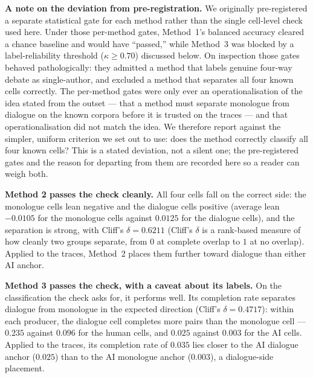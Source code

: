 \documentclass[10pt,twocolumn]{article}
\begin{document}
\textbf{A note on the deviation from pre-registration.} We originally pre-registered a separate
statistical gate for each method rather than the single cell-level check used here. Under those
per-method gates, Method~1's balanced accuracy cleared a chance baseline and would have ``passed,''
while Method~3 was blocked by a label-reliability threshold ($\kappa \ge 0.70$) discussed below. On
inspection those gates behaved pathologically: they admitted a method that labels genuine four-way
debate as single-author, and excluded a method that separates all four known cells correctly. The
per-method gates were only ever an operationalisation of the idea stated from the outset --- that a
method must separate monologue from dialogue on the known corpora before it is trusted on the traces
--- and that operationalisation did not match the idea. We therefore report against the simpler,
uniform criterion we set out to use: does the method correctly classify all four known cells? This is
a stated deviation, not a silent one; the pre-registered gates and the reason for departing from them
are recorded here so a reader can weigh both.

\textbf{Method 2 passes the check cleanly.} All four cells fall on the correct side: the monologue
cells lean negative and the dialogue cells positive (average lean $-0.0105$ for the monologue cells
against $0.0125$ for the dialogue cells), and the separation is strong, with Cliff's $\delta=0.6211$
(Cliff's $\delta$ is a rank-based measure of how cleanly two groups separate, from $0$ at complete
overlap to $1$ at no overlap). Applied to the traces, Method~2 places them further toward dialogue
than either AI anchor.

\textbf{Method 3 passes the check, with a caveat about its labels.} On the classification the check
asks for, it performs well. Its completion rate separates dialogue from monologue in the expected
direction (Cliff's $\delta=0.4717$): within each producer, the dialogue cell completes more pairs than
the monologue cell --- $0.235$ against $0.096$ for the human cells, and $0.025$ against $0.003$ for the
AI cells. Applied to the traces, its completion rate of $0.035$ lies closer to the AI dialogue anchor
($0.025$) than to the AI monologue anchor ($0.003$), a dialogue-side placement.
\end{document}
